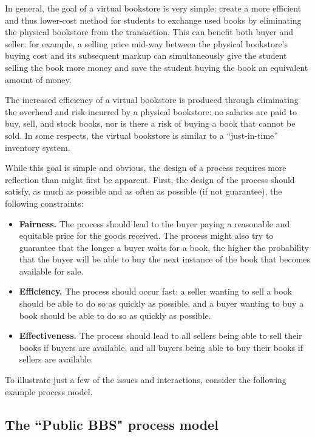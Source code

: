 In general, the goal of a virtual bookstore is very simple: create a more
efficient and thus lower-cost method for students to exchange used books by
eliminating the physical bookstore from the transaction.  This can benefit
both buyer and seller: for example, a selling price mid-way between the
physical bookstore's buying cost and its subsequent markup can
simultaneously give the student selling the book more money and save the
student buying the book an equivalent amount of money.  

The increased efficiency of a virtual bookstore is produced through
eliminating the overhead and risk incurred by a physical bookstore: no
salaries are paid to buy, sell, and stock books, nor is there a risk of
buying a book that cannot be sold.  In some respects, the virtual bookstore
is similar to a ``just-in-time'' inventory system.

While this goal is simple and obvious, the design of a process requires
more reflection than might first be apparent.  First, the design of the
process should satisfy, as much as possible and as often as possible (if
not guarantee), the following constraints:

\begin{itemize}
\item {\bf Fairness.}  The process should lead to the buyer paying a reasonable and
    equitable price for the goods received. The process might also try to
    guarantee that the longer a buyer waits for a book, the higher the
    probability that the buyer will be able to buy the next instance of the
    book that becomes available for sale.

\item {\bf Efficiency.} The process should occur fast: a seller wanting to sell a
    book should be able to do so as quickly as possible, and a buyer
    wanting to buy a book should be able to do so as quickly as possible.

\item {\bf Effectiveness.}  The process should lead to all sellers being able to
    sell their books if buyers are available, and all buyers being able to
    buy their books if sellers are available.
\end{itemize}

To illustrate just a few of the issues and interactions, consider the
following example process model.

\subsection{The ``Public BBS" process model}

